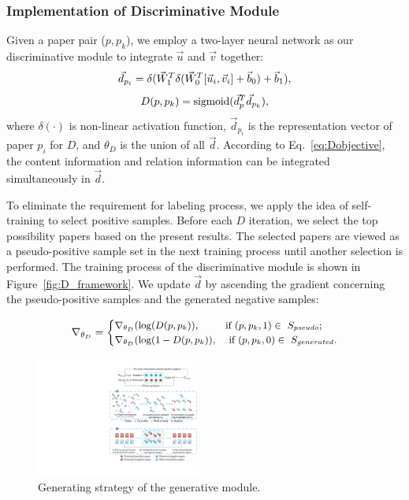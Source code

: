 \documentclass[letterpaper]{article} %
\begin{document}
\subsubsection{Implementation of Discriminative Module}
Given a paper pair ($p, p_k$),
we employ a two-layer neural network as our discriminative module to integrate $\vec{u}$ and $\vec{v}$ together:
\begin{equation}
\centering
\vec{d}_{p_i}=\delta(\vec{W}_1^T\delta(\vec{W}_0^T[\vec{u}_i,\vec{v}_i]+\vec{b}_0)+\vec{b}_1),
\label{eq:d}
\end{equation}
\begin{equation}
\centering
D(p, p_k)=\text{sigmoid}(\vec{d}_{p}^T\vec{d}_{p_k}),
\label{eq:Dobjective}
\end{equation}
where $\delta(\cdot)$ is non-linear activation function, $\vec{d}_{p_i}$ is the representation vector of paper $p_i$ for $D$, and $\theta_D$ is the union of all $\vec{d}$.
According to Eq.~\eqref{eq:Dobjective}, the content information and relation information can be integrated simultaneously in $\vec{d}$.

To eliminate the requirement for labeling process, we apply the idea of self-training \cite{self1,self2} to select positive samples. Before each $D$ iteration, we select the top possibility papers based on the present results. The selected papers are viewed as a pseudo-positive sample set in the next training process until another selection is performed. The training process of the discriminative module is shown in Figure~\ref{fig:D_framework}.
We update $\vec{d}$ by ascending the gradient concerning the pseudo-positive samples and the generated negative samples:

\begin{equation}
\small
\centering
\nabla_{\theta_D} = \begin{cases} \nabla_{\theta_D}(\log(D(p, p_k)), & \mbox{if } (p, p_k, 1) \in \mbox{ $S_{pseudo}$}; \\
\nabla_{\theta_D}(\log(1-D(p, p_k)), & \mbox{ if }  (p, p_k, 0) \in\mbox{ $S_{generated}$}.\\
\end{cases}
\label{eq:Dgradient}
\end{equation}

\begin{figure}[t]
\centering
\includegraphics[width=0.48\textwidth]{G.pdf}
\caption{Generating strategy of the generative module.}
\label{fig:G_framework}
\end{figure}
\end{document}
